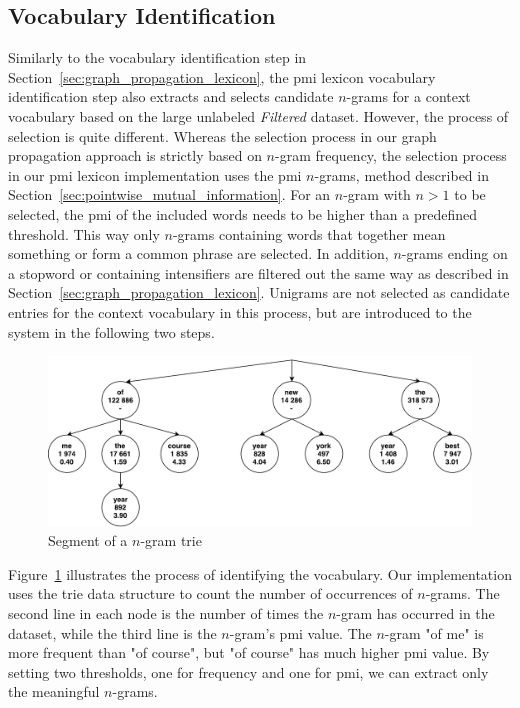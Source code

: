 \subsection*{Vocabulary Identification}
Similarly to the vocabulary identification step in Section~\ref{sec:graph_propagation_lexicon}, the \ac{pmi} lexicon vocabulary identification step also extracts and selects candidate $n$-grams for a context vocabulary based on the large unlabeled \textit{Filtered} dataset. However, the process of selection is quite different. Whereas the selection process in our graph propagation approach is strictly based on $n$-gram frequency, the selection process in our \ac{pmi} lexicon implementation uses the \ac{pmi} $n$-grams, method described in Section~\ref{sec:pointwise_mutual_information}. For an $n$-gram with $n>1$ to be selected, the \ac{pmi} of the included words needs to be higher than a predefined threshold. This way only $n$-grams containing words that together mean something or form a common phrase are selected. In addition, $n$-grams ending on a stopword or containing intensifiers are filtered out the same way as described in Section~\ref{sec:graph_propagation_lexicon}. Unigrams are not selected as candidate entries for the context vocabulary in this process, but are introduced to the system in the following two steps. \\

\begin{figure}[t]
    \centering
    \includegraphics[width=\textwidth]{./figs/token_trie}
    \caption{Segment of a $n$-gram trie}
    \label{fig:trie}
\end{figure}

Figure~\ref{fig:trie} illustrates the process of identifying the vocabulary. Our implementation uses the trie data structure to count the number of occurrences of $n$-grams. The second line in each node is the number of times the $n$-gram has occurred in the dataset, while the third line is the $n$-gram's \ac{pmi} value. The $n$-gram "of me" is more frequent than "of course", but "of course" has much higher \ac{pmi} value. By setting two thresholds, one for frequency and one for \ac{pmi}, we can extract only the meaningful $n$-grams.

